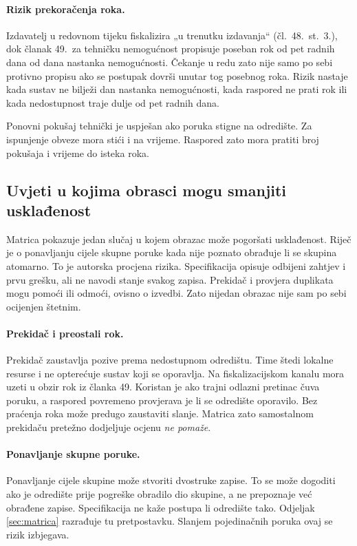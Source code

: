 \paragraph{Rizik prekoračenja roka.}
Izdavatelj u redovnom tijeku fiskalizira „u trenutku izdavanja“
(čl.~48.~st.~3.), dok članak 49.\ za tehničku nemogućnost propisuje poseban
rok od pet radnih dana od dana nastanka nemogućnosti. Čekanje u redu zato
nije samo po sebi protivno propisu ako se postupak dovrši unutar tog
posebnog roka. Rizik nastaje kada sustav ne bilježi dan nastanka nemogućnosti,
kada raspored ne prati rok ili kada nedostupnost traje dulje od pet radnih dana.

Ponovni pokušaj tehnički je uspješan ako poruka stigne na odredište. Za
ispunjenje obveze mora stići i na vrijeme. Raspored zato mora pratiti broj
pokušaja i vrijeme do isteka roka.

\subsection{Uvjeti u kojima obrasci mogu smanjiti usklađenost}
\label{sec:pogorsanje}

Matrica pokazuje jedan slučaj u kojem obrazac može pogoršati usklađenost.
Riječ je o ponavljanju cijele skupne poruke kada nije poznato obrađuje li se
skupina atomarno. To je autorska procjena rizika. Specifikacija opisuje
odbijeni zahtjev i prvu grešku, ali ne navodi stanje svakog zapisa. Prekidač
i provjera duplikata mogu pomoći ili odmoći, ovisno o izvedbi. Zato nijedan
obrazac nije sam po sebi ocijenjen štetnim.

\paragraph{Prekidač i preostali rok.}
Prekidač zaustavlja pozive prema nedostupnom odredištu. Time štedi lokalne
resurse i ne opterećuje sustav koji se oporavlja. Na fiskalizacijskom kanalu
mora uzeti u obzir rok iz članka 49. Koristan je ako trajni odlazni pretinac
čuva poruku, a raspored povremeno provjerava je li se odredište oporavilo.
Bez praćenja roka može predugo zaustaviti slanje. Matrica zato samostalnom
prekidaču pretežno dodjeljuje ocjenu \emph{ne pomaže}.

\paragraph{Ponavljanje skupne poruke.}
Ponavljanje cijele skupine može stvoriti dvostruke zapise. To se može dogoditi
ako je odredište prije pogreške obradilo dio skupine, a ne prepoznaje već
obrađene zapise. Specifikacija ne kaže postupa li odredište tako. Odjeljak
\ref{sec:matrica} razrađuje tu pretpostavku. Slanjem pojedinačnih poruka ovaj
se rizik izbjegava.

